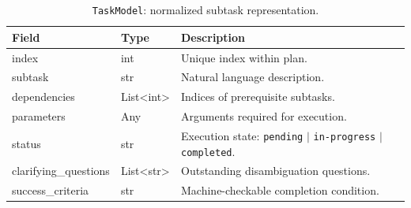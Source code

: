 \begin{table}[!htbp]
  \centering
  \caption{\texttt{TaskModel}: normalized subtask representation.}
  \label{tab:taskmodel}
  \begin{tabularx}{\linewidth}{@{} l l X @{}}
    \toprule
    \textbf{Field} & \textbf{Type} & \textbf{Description} \\
    \midrule
    index & int & Unique index within plan. \\
    subtask & str & Natural language description. \\
    dependencies & List\textless{}int\textgreater{} & Indices of prerequisite subtasks. \\
    parameters & Any & Arguments required for execution. \\
    status & str & Execution state: \texttt{pending} \(|\) \texttt{in-progress} \(|\) \texttt{completed}. \\
    clarifying\_questions & List\textless{}str\textgreater{} & Outstanding disambiguation questions. \\
    success\_criteria & str & Machine-checkable completion condition. \\
    \bottomrule
  \end{tabularx}
\end{table}

\FloatBarrier
\vspace{8pt}

\vspace{2pt}
\FloatBarrier

